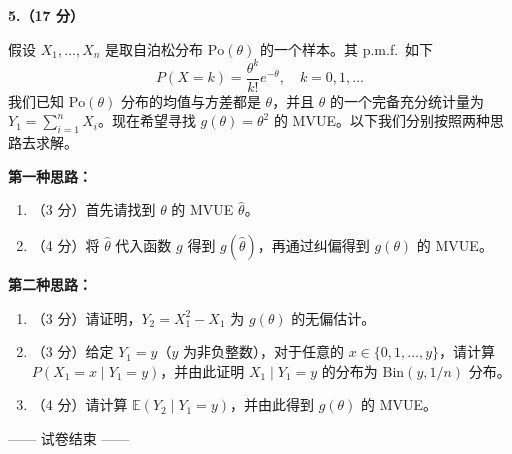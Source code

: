 \documentclass[12pt,a4paper]{ctexart}
\newcommand{\question}[2]{\bigskip\noindent\textbf{#1}\par\nobreak\medskip}
\newcommand{\E}{\mathbb{E}}
\begin{document}
\question{5.（17 分）}{17}
假设 $X_{1},\ldots,X_{n}$ 是取自泊松分布 $\mathrm{Po}(\theta)$ 的一个样本。其 p.m.f.\ 如下
\[ P(X=k)=\frac{\theta^{k}}{k!}e^{-\theta},\quad k=0,1,\ldots \]
我们已知 $\mathrm{Po}(\theta)$ 分布的均值与方差都是 $\theta$，并且 $\theta$ 的一个完备充分统计量为 $Y_{1}=\sum_{i=1}^{n}X_{i}$。现在希望寻找 $g(\theta)=\theta^{2}$ 的 MVUE。以下我们分别按照两种思路去求解。

\medskip\noindent\textbf{第一种思路：}
\begin{enumerate}[label=(\alph*),leftmargin=2.4em]
  \item （3 分）首先请找到 $\theta$ 的 MVUE $\widehat{\theta}$。
  \item （4 分）将 $\widehat{\theta}$ 代入函数 $g$ 得到 $g(\widehat{\theta})$，再通过纠偏得到 $g(\theta)$ 的 MVUE。
\end{enumerate}

\medskip\noindent\textbf{第二种思路：}
\begin{enumerate}[label=(\alph*),leftmargin=2.4em,resume]
  \item （3 分）请证明，$Y_{2}=X_{1}^{2}-X_{1}$ 为 $g(\theta)$ 的无偏估计。
  \item （3 分）给定 $Y_{1}=y$（$y$ 为非负整数），对于任意的 $x\in\{0,1,\ldots,y\}$，请计算 $P(X_{1}=x\mid Y_{1}=y)$，并由此证明 $X_{1}\mid Y_{1}=y$ 的分布为 $\mathrm{Bin}(y,1/n)$ 分布。
  \item （4 分）请计算 $\E(Y_{2}\mid Y_{1}=y)$，并由此得到 $g(\theta)$ 的 MVUE。
\end{enumerate}

\vfill
\begin{center}\small —— 试卷结束 ——\end{center}
\end{document}

